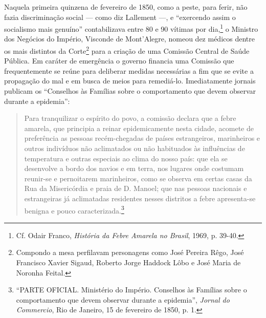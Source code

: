 Naquela primeira quinzena de fevereiro de 1850, como a peste, para
ferir, não fazia discriminação social --- como diz Lallement ---, e
``exercendo assim o socialismo mais genuíno'' contabilizava entre 80 e
90 vítimas por dia,\footnote{Cf. Odair Franco, \textit{História da Febre
  Amarela no Brasil}, 1969, p. 39-40.} o Ministro dos Negócios do
Império, Visconde de Mont'Alegre, nomeou dez médicos dentre os mais
distintos da Corte\footnote{Compondo a mesa perfilavam personagens como
  José Pereira Rêgo, José Francisco Xavier Sigaud, Roberto Jorge Haddock
  Lôbo e José Maria de Noronha Feital.} para a criação de uma Comissão
Central de Saúde Pública. Em caráter de emergência o governo financia
uma Comissão que frequentemente se reúne para deliberar medidas
necessárias a fim que se evite a propagação do mal e em busca de meios
para remediá-lo. Imediatamente jornais publicam os ``Conselhos às
Famílias sobre o comportamento que devem observar durante a epidemia'':

\begin{quote}
Para tranquilizar o espírito do povo, a comissão declara que a febre
amarela, que principia a reinar epidemicamente nesta cidade, acomete de
preferência as pessoas recém-chegadas de países estrangeiros,
marinheiros e outros indivíduos não aclimatados ou não habituados às
influências de temperatura e outras especiais ao clima do nosso país:
que ela se desenvolve a bordo dos navios e em terra, nos lugares onde
costumam reunir-se e pernoitarem marinheiros, como se observa em certas
casas da Rua da Misericórdia e praia de D. Manoel; que nas pessoas
nacionais e estrangeiras já aclimatadas residentes nesses distritos a
febre apresenta-se benigna e pouco caracterizada.\footnote{``PARTE
  OFICIAL. Ministério do Império. Conselhos às Famílias sobre o
  comportamento que devem observar durante a epidemia'', \textit{Jornal do
  Commercio}, Rio de Janeiro, 15 de fevereiro de 1850, p. 1.}
\end{quote}

